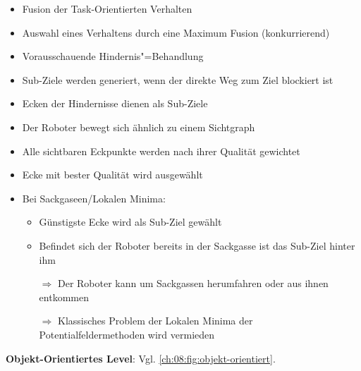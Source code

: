 \begin{itemize}
	\item Fusion der Task-Orientierten Verhalten
	\item Auswahl eines Verhaltens durch eine Maximum Fusion (konkurrierend)
	\item Vorausschauende Hindernis"=Behandlung
	\item Sub-Ziele werden generiert, wenn der direkte Weg zum Ziel blockiert ist
	\item Ecken der Hindernisse dienen als Sub-Ziele
	\item Der Roboter bewegt sich ähnlich zu einem Sichtgraph
	\item Alle sichtbaren Eckpunkte werden nach ihrer Qualität gewichtet
	\item Ecke mit bester Qualität wird ausgewählt
	\item Bei Sackgaseen/Lokalen Minima:
	\begin{itemize}
		\item Günstigste Ecke wird als Sub-Ziel gewählt
		\item Befindet sich der Roboter bereits in der Sackgasse ist das Sub-Ziel hinter ihm
		\item[$\Rightarrow$] Der Roboter kann um Sackgassen herumfahren oder aus ihnen entkommen
		\item[$\Rightarrow$] Klassisches Problem der Lokalen Minima der Potentialfeldermethoden wird vermieden
	\end{itemize}
\end{itemize}
\noindent
\textbf{Objekt-Orientiertes Level}:
Vgl. \autoref{ch:08:fig:objekt-orientiert}.
